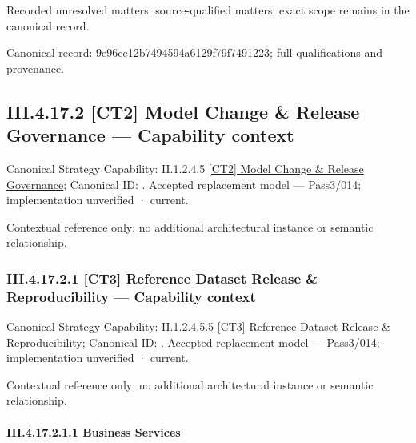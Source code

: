 {\small Recorded unresolved matters: source-qualified matters; exact scope remains in the canonical record.}\par
{\footnotesize \href{../../../../../../../../continuum/business/business-function/9e96ce12b7494594a6129f79f7491223.md}{Canonical record: 9e96ce12b7494594a6129f79f7491223}; full qualifications and provenance.}\par
\subsection*{III.4.17.2 [CT2] Model Change \& Release Governance — Capability context}
\label{navigation:III.4.17.2}

{\small Canonical Strategy Capability: II.1.2.4.5 \hyperref[element:2eb455d8b4284a1fb175a0f1fa462cdf]{[CT2] Model Change \& Release Governance}; Canonical ID: \texttt{}. Accepted replacement model — Pass3/014; implementation unverified · current.}\par
Contextual reference only; no additional architectural instance or semantic relationship.\par
\subsubsection*{III.4.17.2.1 [CT3] Reference Dataset Release \& Reproducibility — Capability context}
\label{navigation:III.4.17.2.1}

{\small Canonical Strategy Capability: II.1.2.4.5.5 \hyperref[element:b01212ce058843b2bfee85a6d3062525]{[CT3] Reference Dataset Release \& Reproducibility}; Canonical ID: \texttt{}. Accepted replacement model — Pass3/014; implementation unverified · current.}\par
Contextual reference only; no additional architectural instance or semantic relationship.\par
\paragraph*{III.4.17.2.1.1 Business Services}
\label{navigation:III.4.17.2.1.1}

